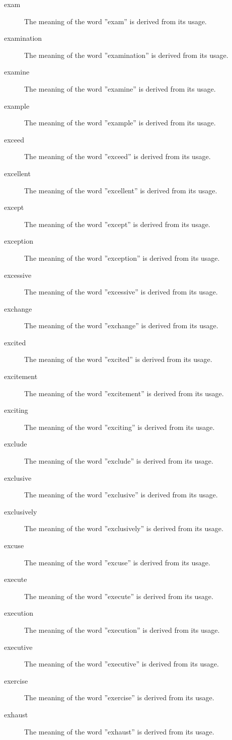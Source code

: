 \documentclass[12pt, letterpaper]{memoir}
\begin{document}
\begin{description}
\item[exam] The meaning of the word ''exam'' is derived from its usage.
\item[examination] The meaning of the word ''examination'' is derived from its usage.
\item[examine] The meaning of the word ''examine'' is derived from its usage.
\item[example] The meaning of the word ''example'' is derived from its usage.
\item[exceed] The meaning of the word ''exceed'' is derived from its usage.
\item[excellent] The meaning of the word ''excellent'' is derived from its usage.
\item[except] The meaning of the word ''except'' is derived from its usage.
\item[exception] The meaning of the word ''exception'' is derived from its usage.
\item[excessive] The meaning of the word ''excessive'' is derived from its usage.
\item[exchange] The meaning of the word ''exchange'' is derived from its usage.
\item[excited] The meaning of the word ''excited'' is derived from its usage.
\item[excitement] The meaning of the word ''excitement'' is derived from its usage.
\item[exciting] The meaning of the word ''exciting'' is derived from its usage.
\item[exclude] The meaning of the word ''exclude'' is derived from its usage.
\item[exclusive] The meaning of the word ''exclusive'' is derived from its usage.
\item[exclusively] The meaning of the word ''exclusively'' is derived from its usage.
\item[excuse] The meaning of the word ''excuse'' is derived from its usage.
\item[execute] The meaning of the word ''execute'' is derived from its usage.
\item[execution] The meaning of the word ''execution'' is derived from its usage.
\item[executive] The meaning of the word ''executive'' is derived from its usage.
\item[exercise] The meaning of the word ''exercise'' is derived from its usage.
\item[exhaust] The meaning of the word ''exhaust'' is derived from its usage.

\end{description}
\end{document}
